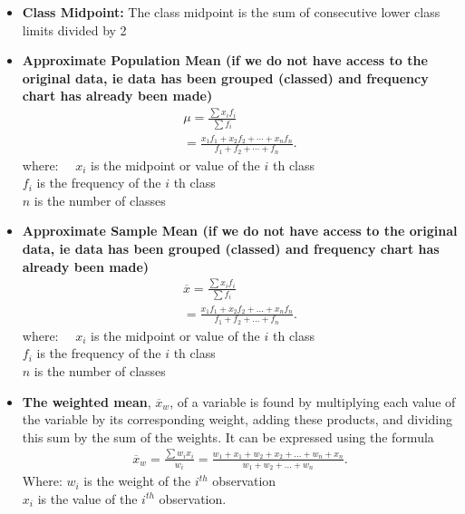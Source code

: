 \documentclass{report}
\begin{document}
         \begin{itemize}
             \item \textbf{Class Midpoint:} The class midpoint is the sum of consecutive lower class limits divided by 2
             \item \textbf{Approximate Population Mean (if we do not have access to the original data, ie data has been grouped (classed) and frequency chart has already been made)}
                \begin{align*}
                    \mu =\frac{\sum x_i f_i}{\sum f_i} \\
                     =\frac{x_1 f_1+x_2 f_2+\cdots+x_n f_n}{f_1+f_2+\cdots+f_n}
                .\end{align*}
            where: $\quad x_i$ is the midpoint or value of the $i$ th class  \\
            $f_i$ is the frequency of the $i$ th class  \\
            $n$ is the number of classes
            \item \textbf{Approximate Sample Mean (if we do not have access to the original data, ie data has been grouped (classed) and frequency chart has already been made)}
                \begin{align*}
                    \overline{x} = \frac{\sum x_{i}f_{i}}{\sum f_{i}} \\
                     = \frac{x_{1}f_{1} + x_{2} f_{2} + ... +x_{n} f_{n}}{f_{1} + f_{2} + ... + f_{n}}
                .\end{align*}
            where: $\quad x_i$ is the midpoint or value of the $i$ th class  \\
            $f_i$ is the frequency of the $i$ th class  \\
            $n$ is the number of classes
            \item \textbf{The weighted mean}, $\overline{x}_{w}$, of a variable is found by multiplying each value of the variable by its corresponding weight, adding these products, and dividing this sum by the sum of the weights. It can be expressed using the formula
                \begin{align*}
                    \overline{x}_{w} = \frac{\sum w_{i}x_{i}}{w_{i}} = \frac{w_{1} + x_{1} + w_{2} + x_{2} + ... + w_{n} + x_{n}}{w_{1} + w_{2} + ... + w_{n}}
                .\end{align*}
                Where: \quad $w_{i}$ is the weight of the $i^{th}$ observation \\
                $x_{i}$ is the value of the $i^{th}$ observation.

\end{itemize}
\end{document}
